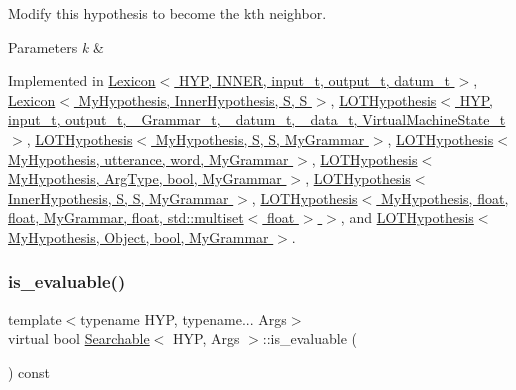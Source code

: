 Modify this hypothesis to become the k\textquotesingle{}th neighbor. 


\begin{DoxyParams}{Parameters}
{\em k} & \\
\hline
\end{DoxyParams}


Implemented in \hyperlink{class_lexicon_a2b17608f66415c6a7d55b6a8f344db21}{Lexicon$<$ H\+Y\+P, I\+N\+N\+E\+R, input\+\_\+t, output\+\_\+t, datum\+\_\+t $>$}, \hyperlink{class_lexicon_a2b17608f66415c6a7d55b6a8f344db21}{Lexicon$<$ My\+Hypothesis, Inner\+Hypothesis, S, S $>$}, \hyperlink{class_l_o_t_hypothesis_ab24d0b8faa360f6a0edc4eefb17d6de7}{L\+O\+T\+Hypothesis$<$ H\+Y\+P, input\+\_\+t, output\+\_\+t, \+\_\+\+Grammar\+\_\+t, \+\_\+datum\+\_\+t, \+\_\+data\+\_\+t, Virtual\+Machine\+State\+\_\+t $>$}, \hyperlink{class_l_o_t_hypothesis_ab24d0b8faa360f6a0edc4eefb17d6de7}{L\+O\+T\+Hypothesis$<$ My\+Hypothesis, S, S, My\+Grammar $>$}, \hyperlink{class_l_o_t_hypothesis_ab24d0b8faa360f6a0edc4eefb17d6de7}{L\+O\+T\+Hypothesis$<$ My\+Hypothesis, utterance, word, My\+Grammar $>$}, \hyperlink{class_l_o_t_hypothesis_ab24d0b8faa360f6a0edc4eefb17d6de7}{L\+O\+T\+Hypothesis$<$ My\+Hypothesis, Arg\+Type, bool, My\+Grammar $>$}, \hyperlink{class_l_o_t_hypothesis_ab24d0b8faa360f6a0edc4eefb17d6de7}{L\+O\+T\+Hypothesis$<$ Inner\+Hypothesis, S, S, My\+Grammar $>$}, \hyperlink{class_l_o_t_hypothesis_ab24d0b8faa360f6a0edc4eefb17d6de7}{L\+O\+T\+Hypothesis$<$ My\+Hypothesis, float, float, My\+Grammar, float, std\+::multiset$<$ float $>$ $>$}, and \hyperlink{class_l_o_t_hypothesis_ab24d0b8faa360f6a0edc4eefb17d6de7}{L\+O\+T\+Hypothesis$<$ My\+Hypothesis, Object, bool, My\+Grammar $>$}.

\mbox{\label{class_searchable_a23786e95730117c3cc4b90e010494a1e}} 
\subsubsection{\texorpdfstring{is\+\_\+evaluable()}{is\_evaluable()}}
{\footnotesize\ttfamily template$<$typename H\+YP, typename... Args$>$ \\
virtual bool \hyperlink{class_searchable}{Searchable}$<$ H\+YP, Args $>$\+::is\+\_\+evaluable (\begin{DoxyParamCaption}{ }\end{DoxyParamCaption}) const\hspace{0.3cm}{\ttfamily [pure virtual]}}



